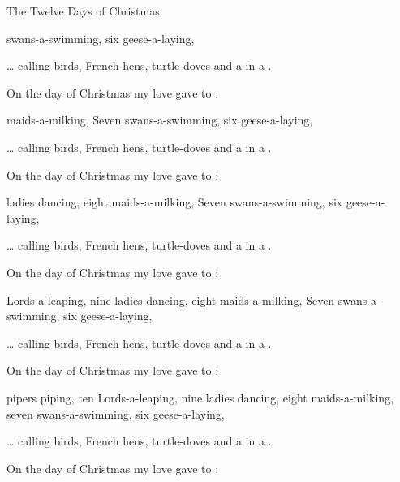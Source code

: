 \begin{SBSong}{The Twelve Days of Christmas}
\begin{SBVerse}
	 swans-a-swimming, 
	six geese-a-laying,
	
	  \ldots 
	 calling birds, 
	 French hens, 
	 turtle-doves 
    and a  in a  .
  \end{SBVerse}
  \begin{SBVerse}
	On the  day of Christmas my  love gave to :

	 maids-a-milking,
	Seven swans-a-swimming, 
	six geese-a-laying,
	
	  \ldots 
	 calling birds, 
	 French hens, 
	 turtle-doves
    and a  in a  .
  \end{SBVerse}
  \begin{SBVerse}
	On the  day of Christmas my  love gave to :

	 ladies dancing, 
	eight maids-a-milking,
	Seven swans-a-swimming, 
	six geese-a-laying,
	
	  \ldots 
	 calling birds, 
	 French hens, 
	 turtle-doves 
    and a  in a  .
  \end{SBVerse}
  \begin{SBVerse}
	On the  day of Christmas my  love gave to :

	 Lords-a-leaping, 
	nine ladies dancing, 
	eight maids-a-milking,
	Seven swans-a-swimming, 
	six geese-a-laying,
	
	  \ldots 
	 calling birds, 
	 French hens, 
	 turtle-doves 
    and a  in a  .
  \end{SBVerse}
  \begin{SBVerse}
	On the  day of Christmas my  love gave to :

	 pipers piping, 
	ten Lords-a-leaping, 
	nine ladies dancing, 
	eight maids-a-milking,
	seven swans-a-swimming, 
	six geese-a-laying,
	
	  \ldots 
	 calling birds, 
	 French hens, 
	 turtle-doves 
    and a  in a  .
  \end{SBVerse}
  \WBPageBrk
  \begin{SBVerse}
	On the  day of Christmas my  love gave to :


\end{SBVerse}
\end{SBSong}
